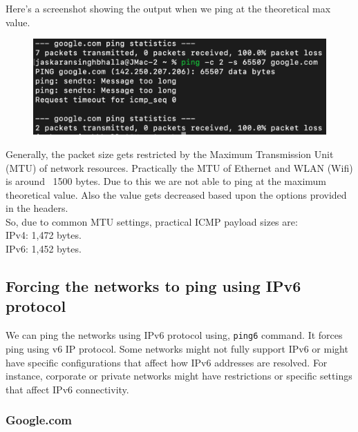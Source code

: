 \documentclass{article}
\begin{document}
\noindent
Here's a screenshot showing the output when we ping at the theoretical max value.\\
\begin{figure}[H]
    \centering
    \begin{minipage}{0.45\textwidth}
        \centering
        \includegraphics[width=\linewidth]{part-1/ping-theoretical-max.png}
    \end{minipage}
\end{figure}


\noindent
Generally, the packet size gets restricted by the Maximum Transmission Unit (MTU) of network resources. Practically the MTU of Ethernet and WLAN (Wifi) is around ~1500 bytes. Due to this we are not able to ping at the maximum theoretical value. Also the value gets decreased based upon the options provided in the headers.\\ 
So, due to common MTU settings, practical ICMP payload sizes are:\\
\textbullet{} IPv4: 1,472 bytes.\\
\textbullet{} IPv6: 1,452 bytes.\\

\subsection{Forcing the networks to ping using IPv6 protocol}

\noindent
We can ping the networks using IPv6 protocol using, \verb|ping6| command. It forces ping using v6 IP protocol.
Some networks might not fully support IPv6 or might have specific configurations that affect how IPv6 addresses are resolved. For instance, corporate or private networks might have restrictions or specific settings that affect IPv6 connectivity.

\subsubsection*{Google.com}
\end{document}
